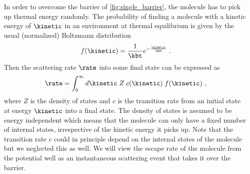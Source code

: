 In order to overcome the barrier of \cref{fig:single_barrier}, the molecule has to pick up thermal energy
randomly. The probability of finding a molecule with a kinetic energy of $\kinetic$ in an environment at
thermal equilibrium is given by the usual (normalized) Boltzmann distribution
%
\begin{align*}
    f(\kinetic) = \frac{1}{\kbt} e^{-\frac{\kinetic}{\kbt}}
    \text{ .}
\end{align*}
%
Then the scattering rate $\rate$ into some final state can be expressed as
%
\begin{align}\label{eq:rate}
    \rate = \int_0^\infty d\kinetic\; Z \;c(\kinetic)\;f(\kinetic)
    \text{ ,}
\end{align}
%
where $Z$ is the density of states and $c$ is the transition rate from an initial state at energy $\kinetic$
into a final state. The density of states is assumed to be energy independent which means that the molecule
can only have a fixed number of internal states, irrespective of the kinetic energy it picks up. Note that the
transition rate $c$ could in principle depend on the internal states of the molecule but we neglected this as
well. We will view the escape rate of the molecule from the potential well as an instantaneous scattering
event that takes it over the barrier.

